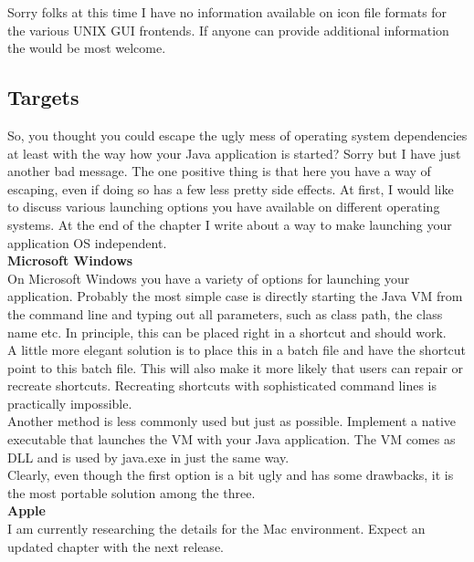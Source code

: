Sorry folks at this time I have no information available on icon file
formats for the various UNIX GUI frontends. If anyone can provide
additional information the would be most welcome.\\

\subsection{Targets}

So, you thought you could escape the ugly mess of operating system
dependencies at least with the way how your Java application is started?
Sorry but I have just another bad message. The one positive thing is
that here you have a way of escaping, even if doing so has a few less
pretty side effects. At first, I would like to discuss various launching
options you have available on different operating systems. At the end of
the chapter I write about a way to make launching your application OS
independent.\\

\textbf{Microsoft Windows}\\

On Microsoft Windows you have a variety of options for launching your
application. Probably the most simple case is directly starting the Java
VM from the command line and typing out all parameters, such as class
path, the class name etc. In principle, this can be placed right in a
shortcut and should work.\\

A little more elegant solution is to place this in a batch file and have
the shortcut point to this batch file. This will also make it more
likely that users can repair or recreate shortcuts. Recreating shortcuts
with sophisticated command lines is practically impossible.\\

Another method is less commonly used but just as possible. Implement a
native executable that launches the VM with your Java application. The
VM comes as DLL and is used by java.exe in just the same way.\\

Clearly, even though the first option is a bit ugly and has some
drawbacks, it is the most portable solution among the three.\\

\textbf{Apple}\\

I am currently researching the details for the Mac environment. Expect
an updated chapter with the next release.\\


